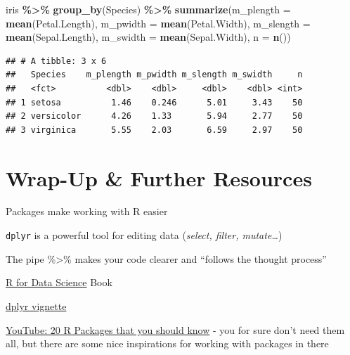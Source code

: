 \documentclass[
]{book}
\newenvironment{Shaded}{\begin{snugshade}}{\end{snugshade}}
\newcommand{\AttributeTok}[1]{\textcolor[rgb]{0.13,0.29,0.53}{#1}}
\newcommand{\FunctionTok}[1]{\textcolor[rgb]{0.13,0.29,0.53}{\textbf{#1}}}
\newcommand{\NormalTok}[1]{#1}
\newcommand{\SpecialCharTok}[1]{\textcolor[rgb]{0.81,0.36,0.00}{\textbf{#1}}}
\begin{document}
\begin{Shaded}
\begin{Highlighting}[]
\NormalTok{iris }\SpecialCharTok{\%\textgreater{}\%} 
  \FunctionTok{group\_by}\NormalTok{(Species) }\SpecialCharTok{\%\textgreater{}\%} 
  \FunctionTok{summarize}\NormalTok{(}\AttributeTok{m\_plength =} \FunctionTok{mean}\NormalTok{(Petal.Length),}
            \AttributeTok{m\_pwidth =} \FunctionTok{mean}\NormalTok{(Petal.Width),}
            \AttributeTok{m\_slength =} \FunctionTok{mean}\NormalTok{(Sepal.Length),}
            \AttributeTok{m\_swidth =} \FunctionTok{mean}\NormalTok{(Sepal.Width),}
            \AttributeTok{n =} \FunctionTok{n}\NormalTok{())}
\end{Highlighting}
\end{Shaded}

\begin{verbatim}
## # A tibble: 3 x 6
##   Species    m_plength m_pwidth m_slength m_swidth     n
##   <fct>          <dbl>    <dbl>     <dbl>    <dbl> <int>
## 1 setosa          1.46    0.246      5.01     3.43    50
## 2 versicolor      4.26    1.33       5.94     2.77    50
## 3 virginica       5.55    2.03       6.59     2.97    50
\end{verbatim}

\section{Wrap-Up \& Further Resources}\label{wrap-up-further-resources-2}

Packages make working with R easier

\texttt{dplyr} is a powerful tool for editing data (\emph{select, filter, mutate\ldots{}})

The pipe \%\textgreater\% makes your code clearer and ``follows the thought process''

\href{https://r4ds.hadley.nz/}{R for Data Science} Book

\href{https://dplyr.tidyverse.org/}{dplyr vignette}

\href{https://www.youtube.com/watch?v=npOf6aXdguY&ab_channel=RichardOnData}{YouTube: 20 R Packages that you should know} - you for sure don't need them all, but there are some nice inspirations for working with packages in there
\end{document}

